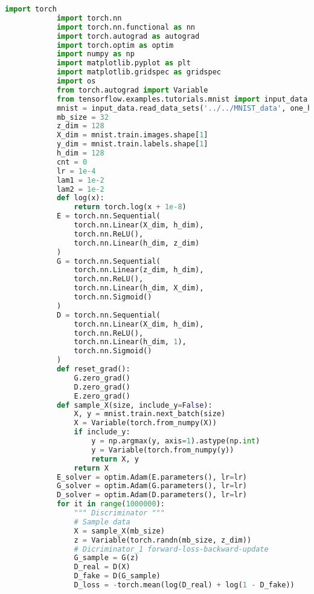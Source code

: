             \begin{lstlisting}[language = Python]
            import torch
            import torch.nn
            import torch.nn.functional as nn
            import torch.autograd as autograd
            import torch.optim as optim
            import numpy as np
            import matplotlib.pyplot as plt
            import matplotlib.gridspec as gridspec
            import os
            from torch.autograd import Variable
            from tensorflow.examples.tutorials.mnist import input_data
            mnist = input_data.read_data_sets('../../MNIST_data', one_hot=True)
            mb_size = 32
            z_dim = 128
            X_dim = mnist.train.images.shape[1]
            y_dim = mnist.train.labels.shape[1]
            h_dim = 128
            cnt = 0
            lr = 1e-4
            lam1 = 1e-2
            lam2 = 1e-2
            def log(x):
                return torch.log(x + 1e-8)
            E = torch.nn.Sequential(
                torch.nn.Linear(X_dim, h_dim),
                torch.nn.ReLU(),
                torch.nn.Linear(h_dim, z_dim)
            )
            G = torch.nn.Sequential(
                torch.nn.Linear(z_dim, h_dim),
                torch.nn.ReLU(),
                torch.nn.Linear(h_dim, X_dim),
                torch.nn.Sigmoid()
            )
            D = torch.nn.Sequential(
                torch.nn.Linear(X_dim, h_dim),
                torch.nn.ReLU(),
                torch.nn.Linear(h_dim, 1),
                torch.nn.Sigmoid()
            )
            def reset_grad():
                G.zero_grad()
                D.zero_grad()
                E.zero_grad()
            def sample_X(size, include_y=False):
                X, y = mnist.train.next_batch(size)
                X = Variable(torch.from_numpy(X))
                if include_y:
                    y = np.argmax(y, axis=1).astype(np.int)
                    y = Variable(torch.from_numpy(y))
                    return X, y
                return X
            E_solver = optim.Adam(E.parameters(), lr=lr)
            G_solver = optim.Adam(G.parameters(), lr=lr)
            D_solver = optim.Adam(D.parameters(), lr=lr)
            for it in range(1000000):
                """ Discriminator """
                # Sample data
                X = sample_X(mb_size)
                z = Variable(torch.randn(mb_size, z_dim))
                # Dicriminator_1 forward-loss-backward-update
                G_sample = G(z)
                D_real = D(X)
                D_fake = D(G_sample)
                D_loss = -torch.mean(log(D_real) + log(1 - D_fake))

\end{lstlisting}

